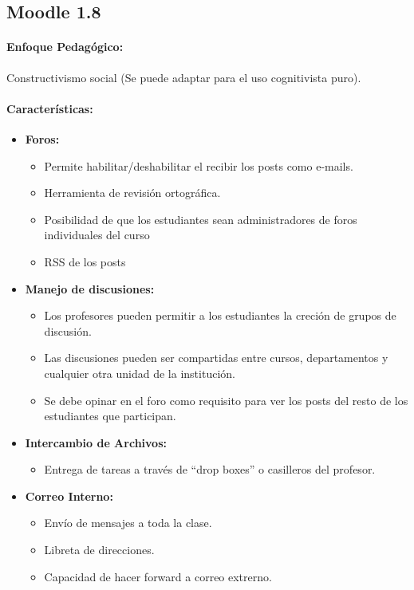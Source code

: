 \subsection{Moodle 1.8}
	\paragraph{Enfoque Pedagógico:} Constructivismo social (Se puede adaptar para el uso cognitivista puro).
	\paragraph{Características:}
	\begin{itemize}
		\item \textbf{Foros:}
			\begin{itemize}
				\item Permite habilitar/deshabilitar el recibir los posts como e-mails.
				\item Herramienta de revisión ortográfica.
				\item Posibilidad de que los estudiantes sean administradores de foros individuales del curso
				\item RSS de los posts
			\end{itemize}
	\end{itemize}
	\begin{itemize}
		\item \textbf{Manejo de discusiones:}
			\begin{itemize}
				\item Los profesores pueden permitir a los estudiantes la creción de grupos de discusión.
				\item Las discusiones pueden ser compartidas entre cursos, departamentos y cualquier otra unidad de la institución.
				\item Se debe opinar en el foro como requisito para ver los posts del resto de los estudiantes que participan.
			\end{itemize}
	\end{itemize}
	\begin{itemize}
		\item \textbf{Intercambio de Archivos:}
			\begin{itemize}
				\item Entrega de tareas a través de ``drop boxes'' o casilleros del profesor.
			\end{itemize}
	\end{itemize}
	\begin{itemize}
		\item \textbf{Correo Interno:}
			\begin{itemize}
				\item Envío de mensajes a toda la clase.
				\item Libreta de direcciones.
				\item Capacidad de hacer forward a correo extrerno.
			\end{itemize}
	\end{itemize}
